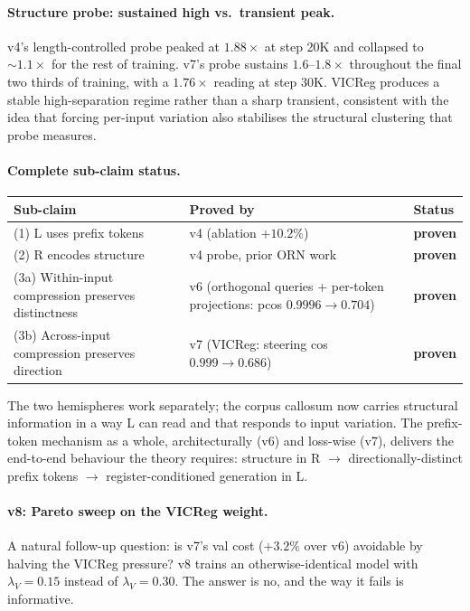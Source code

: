 \documentclass[11pt, a4paper]{article}
\theoremstyle{plain}
\theoremstyle{definition}
\theoremstyle{remark}
\begin{document}
\paragraph{Structure probe: sustained high vs.\ transient peak.}
v4's length-controlled probe peaked at $1.88\times$ at step 20K and collapsed to $\sim 1.1\times$ for the rest of training.
v7's probe sustains $1.6$--$1.8\times$ throughout the final two thirds of training, with a $1.76\times$ reading at step 30K.
VICReg produces a stable high-separation regime rather than a sharp transient, consistent with the idea that forcing per-input variation also stabilises the structural clustering that probe measures.

\paragraph{Complete sub-claim status.}

\begin{center}
\begin{tabular}{p{4.5cm}p{4.5cm}p{3cm}}
\toprule
Sub-claim & Proved by & Status \\
\midrule
(1) L uses prefix tokens & v4 (ablation $+10.2\%$) & \textbf{proven} \\
(2) R encodes structure & v4 probe, prior ORN work & \textbf{proven} \\
(3a) Within-input compression preserves distinctness & v6 (orthogonal queries + per-token projections: pcos $0.9996 \to 0.704$) & \textbf{proven} \\
(3b) Across-input compression preserves direction & v7 (VICReg: steering cos $0.999 \to 0.686$) & \textbf{proven} \\
\bottomrule
\end{tabular}
\end{center}

The two hemispheres work separately; the corpus callosum now carries structural information in a way L can read and that responds to input variation.
The prefix-token mechanism as a whole, architecturally (v6) and loss-wise (v7), delivers the end-to-end behaviour the theory requires: structure in R $\to$ directionally-distinct prefix tokens $\to$ register-conditioned generation in L.

\paragraph{v8: Pareto sweep on the VICReg weight.}
A natural follow-up question: is v7's val cost ($+3.2\%$ over v6) avoidable by halving the VICReg pressure?
v8 trains an otherwise-identical model with $\lambda_V = 0.15$ instead of $\lambda_V = 0.30$.
The answer is no, and the way it fails is informative.
\end{document}

